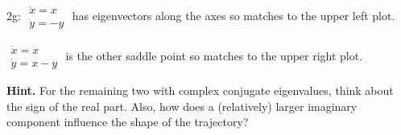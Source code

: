 \documentclass[12pt]{amsart}
\theoremstyle{conjecture}
\theoremstyle{definition}
\theoremstyle{question}
\theoremstyle{theorem}
\newcommand{\sys}[2]{\begin{aligned}#1\\#2\end{aligned}}
\begin{document}
    2g: $\sys{\dot x=x}{\dot y=-y}$ has eigenvectors along the axes so matches to the upper left plot.

    $\sys{\dot x=x}{\dot y=x-y}$ is the other saddle point so matches to the upper right plot.

    \textbf{Hint.} For the remaining two with complex conjugate eigenvalues, think about the sign of the real part. Also, how does a (relatively) larger imaginary component influence the shape of the trajectory?
\end{document}
